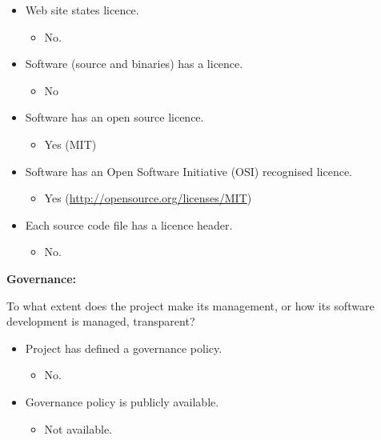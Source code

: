 \begin{itemize}
\itemsep1pt\parskip0pt
\item
  Web site states licence.

  \begin{itemize}
  \itemsep1pt\parskip0pt
  \item
    No.
  \end{itemize}
\item
  Software (source and binaries) has a licence.

  \begin{itemize}
  \itemsep1pt\parskip0pt
  \item
    No
  \end{itemize}
\item
  Software has an open source licence.

  \begin{itemize}
  \itemsep1pt\parskip0pt
  \item
    Yes (MIT)
  \end{itemize}
\item
  Software has an Open Software Initiative (OSI) recognised licence.

  \begin{itemize}
  \itemsep1pt\parskip0pt
  \item
    Yes (\url{http://opensource.org/licenses/MIT})
  \end{itemize}
\item
  Each source code file has a licence header.

  \begin{itemize}
  \itemsep1pt\parskip0pt
  \item
    No.
  \end{itemize}
\end{itemize}

\textbf{Governance:}

To what extent does the project make its management, or how its software
development is managed, transparent?

\begin{itemize}
\itemsep1pt\parskip0pt
\item
  Project has defined a governance policy.

  \begin{itemize}
  \itemsep1pt\parskip0pt
  \item
    No.
  \end{itemize}
\item
  Governance policy is publicly available.

  \begin{itemize}
  \itemsep1pt\parskip0pt
  \item
    Not available.
  \end{itemize}
\end{itemize}

